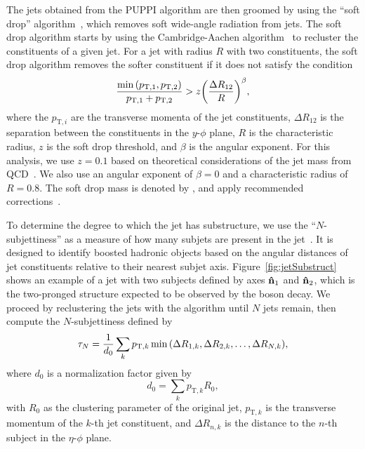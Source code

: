 The jets obtained from the PUPPI algorithm are then groomed by using the ``soft drop'' algorithm~\cite{Larkoski_2014}, which removes soft wide-angle radiation from jets.
The soft drop algorithm starts by using the Cambridge-Aachen algorithm~\cite{Dokshitzer_1997,Wobisch:393035} to recluster the constituents of a given jet.
For a jet with radius $R$ with two constituents, the soft drop algorithm removes the softer constituent if it does not satisfy the condition
\begin{equation}
  \frac{\min\pqty{p_{\mathrm{T},1},p_{\mathrm{T},2}}}{p_{\mathrm{T},1}+p_{\mathrm{T},2}}>z\pqty{\frac{\Delta R_{12}}{R}}^\beta,
\end{equation}
where the $p_{\mathrm{T},i}$ are the transverse momenta of the jet constituents, $\Delta R_{12}$ is the separation between the constituents in the $y$-$\phi$ plane, $R$ is the characteristic radius, $z$ is the soft drop threshold, and $\beta$ is the angular exponent.
For this analysis, we use $z=0.1$ based on theoretical considerations of the jet mass from QCD~\cite{Dasgupta_2013,Dasgupta_2013_2}.
We also use an angular exponent of $\beta=0$ and a characteristic radius of $R=0.8$.
The soft drop mass is denoted by \MJ, and apply recommended corrections~\cite{Butterworth:2008iy}.

To determine the degree to which the jet has substructure, we use the ``$N$-subjettiness'' as a measure of how many subjets are present in the jet~\cite{Thaler_2011,Thaler_2012}.
It is designed to identify boosted hadronic objects based on the angular distances of jet constituents relative to their nearest subjet axis.
Figure~\ref{fig:jetSubstruct} shows an example of a jet with two subjects defined by axes $\vu{n}_1$ and $\vu{n}_2$, which is the two-pronged structure expected to be observed by the \Vhad boson decay.
We proceed by reclustering the jets with the \kt algorithm until $N$ jets remain, then compute the $N$-subjettiness defined by
\begin{equation}
  \tau_N=\frac{1}{d_0}\sum_kp_{\mathrm{T},k}\min\pqty{\Delta R_{1,k},\Delta R_{2,k},\ldots,\Delta R_{N,k}},
\end{equation}
where $d_0$ is a normalization factor given by
\begin{equation}
  d_0=\sum_kp_{\mathrm{T},k}R_0,
\end{equation}
with $R_0$ as the clustering parameter of the original jet, $p_{\mathrm{T},k}$ is the transverse momentum of the $k$-th jet constituent, and $\Delta R_{n,k}$ is the distance to the $n$-th subject in the $\eta$-$\phi$ plane.

